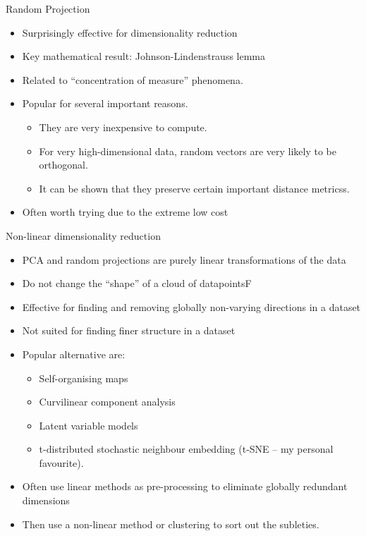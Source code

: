 \documentclass{beamer}
\begin{document}
\begin{frame}{Random Projection}
  \begin{itemize}
    \item Surprisingly effective for dimensionality reduction
    \item Key mathematical result: Johnson-Lindenstrauss lemma
    \item Related to ``concentration of measure'' phenomena. 
    \item Popular for several important reasons.
    \begin{itemize}
      \item They are very inexpensive to compute.
      \item For very high-dimensional data, random vectors are very likely to be orthogonal.
      \item It can be shown that they preserve certain important distance metricss.
    \end{itemize}
    \item Often worth trying due to the extreme low cost
  \end{itemize}

\end{frame}


\begin{frame}{Non-linear dimensionality reduction}
  \begin{itemize}
    \item PCA and random projections are purely linear transformations of the data
    \item Do not change the ``shape'' of a cloud of datapointsF
    \item Effective for finding and removing globally non-varying directions in a dataset
    \item Not suited for finding finer structure in a dataset
    \item Popular alternative are:
    \begin{itemize}
      \item Self-organising maps
      \item Curvilinear component analysis
      \item Latent variable models
      \item t-distributed stochastic neighbour embedding (t-SNE -- my personal favourite).
    \end{itemize}
    \item Often use linear methods as pre-processing to eliminate globally redundant dimensions 
    \item Then use a non-linear method or clustering to sort out the subleties.
  \end{itemize}
\end{frame}
\end{document}
